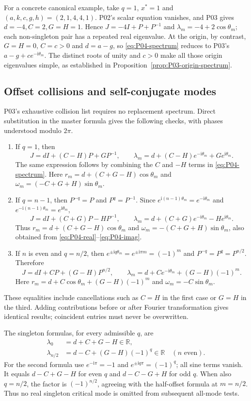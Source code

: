 \documentclass[11pt]{article}
\newcommand{\R}{\mathbb{R}}
\newcommand{\ii}{\mathrm{i}}
\theoremstyle{definition}
\theoremstyle{remark}
\begin{document}
For a concrete canonical example, take $q=1$, $x^*=1$ and
$(a,k,c,g,h)=(2,1,4,4,1)$. P02's scalar equation vanishes,
and P03 gives $d=-4,C=2,G=H=1$. Hence
$J=-4I+P+P^{-1}$ and $\lambda_m=-4+2\cos\theta_m$;
each non-singleton pair has a repeated real eigenvalue.
At the origin, by contrast, $G=H=0$, $C=c>0$ and $d=a-g$,
so \eqref{eq:P04-spectrum} reduces to P03's
$a-g+ce^{-\ii\theta_m}$. The distinct roots of unity and $c>0$
make all those origin eigenvalues simple, as established in
Proposition~\ref{prop:P03-origin-spectrum}.

\subsection{Offset collisions and self-conjugate modes}
\label{slot:P04-extra-1}

P03's exhaustive collision list requires no replacement spectrum.
Direct substitution in the master formula gives the following
checks, with phases understood modulo $2\pi$.
\begin{enumerate}[label=(\roman*),leftmargin=*]
\item If $q=1$, then
\[
 J=dI+(C-H)P+GP^{-1},\qquad
 \lambda_m=d+(C-H)e^{-\ii\theta_m}+Ge^{\ii\theta_m}.
\]
The same expression follows by combining the $C$ and $-H$ terms
in \eqref{eq:P04-spectrum}. Here
$r_m=d+(C+G-H)\cos\theta_m$ and
$\omega_m=(-C+G+H)\sin\theta_m$.
\item If $q=n-1$, then $P^{-q}=P$ and $P^q=P^{-1}$.
Since $e^{\ii(n-1)\theta_m}=e^{-\ii\theta_m}$ and
$e^{-\ii(n-1)\theta_m}=e^{\ii\theta_m}$,
\[
 J=dI+(C+G)P-HP^{-1},\qquad
 \lambda_m=d+(C+G)e^{-\ii\theta_m}-He^{\ii\theta_m}.
\]
Thus $r_m=d+(C+G-H)\cos\theta_m$ and
$\omega_m=-(C+G+H)\sin\theta_m$, also obtained from
\eqref{eq:P04-real}--\eqref{eq:P04-imag}.
\item If $n$ is even and $q=n/2$, then
$e^{\pm\ii q\theta_m}=e^{\pm\ii\pi m}=(-1)^m$ and
$P^{-q}=P^q=P^{n/2}$. Therefore
\[
 J=dI+CP+(G-H)P^{n/2},\qquad
 \lambda_m=d+Ce^{-\ii\theta_m}+(G-H)(-1)^m.
\]
Here $r_m=d+C\cos\theta_m+(G-H)(-1)^m$ and
$\omega_m=-C\sin\theta_m$.
\end{enumerate}
These equalities include cancellations such as $C=H$ in the first
case or $G=H$ in the third. Adding contributions before or after
Fourier transformation gives identical results; coincident entries
must never be overwritten.

The singleton formulas, for every admissible $q$, are
\begin{align}
 \lambda_0&=d+C+G-H\in\R,\label{eq:P04-zero-mode}\\
 \lambda_{n/2}&=d-C+(G-H)(-1)^q\in\R
       \quad(n\text{ even}).\label{eq:P04-half-mode}
\end{align}
For the second formula use $e^{-\ii\pi}=-1$ and
$e^{\pm\ii q\pi}=(-1)^q$; all sine terms vanish.
It equals $d-C+G-H$ for even $q$ and $d-C-G+H$ for odd $q$.
When also $q=n/2$, the factor is $(-1)^{n/2}$, agreeing with the
half-offset formula at $m=n/2$. Thus no real singleton critical
mode is omitted from subsequent all-mode tests.
\end{document}
